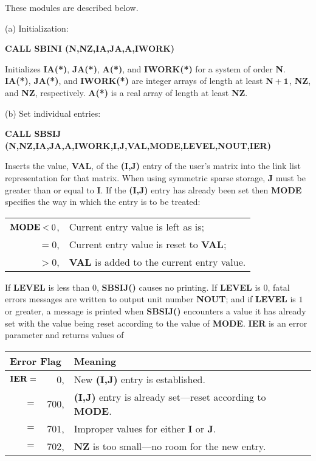 \noindent
These modules are described below.
 
\bigskip 
 (a) Initialization:
 
\bigskip
\centerline{\bf CALL SBINI (N,NZ,IA,JA,A,IWORK)}
\bigskip
 
\noindent
Initializes {\bf IA(*)}, {\bf JA(*)}, {\bf A(*)}, and {\bf IWORK(*)} for 
a system of order {\bf N}.  {\bf IA(*)}, {\bf JA(*)}, and {\bf IWORK(*)} 
are integer arrays of length at least ${\bf N+1}$, {\bf NZ}, and {\bf NZ}, 
respectively.  {\bf A(*)} is a real array of length at least {\bf NZ}.
 
\bigskip 
 (b) Set individual entries:
 
\bigskip
\centerline{\bf CALL SBSIJ (N,NZ,IA,JA,A,IWORK,I,J,VAL,MODE,LEVEL,NOUT,IER)}
\bigskip
 
\noindent 
Inserts the value, {\bf VAL}, of the {\bf (I,J)} entry of the user's 
matrix into the link list representation for that matrix.  When using 
symmetric sparse storage, {\bf J} must be greater than or equal to 
{\bf I}. If the {\bf (I,J)} entry has already been set then {\bf MODE} 
specifies the way in which the entry is to be treated: 
 
\bigskip
\begin{tabular}{rl} 
  ${\bf MODE}<0$, & Current entry value is left as is; \\
            $=0$, & Current entry value is reset to {\bf VAL}; \\
            $>0$, & {\bf VAL} is added to the current entry value.
\end{tabular} 
\bigskip
 
\noindent
If {\bf LEVEL} is less than $0$, {\bf SBSIJ()} causes no printing.  If
{\bf LEVEL} is $0$, fatal errors messages are written to output unit 
number {\bf NOUT}; and if {\bf LEVEL} is $1$ or greater, a message is 
printed when {\bf SBSIJ()} encounters a value it has already set with the 
value being reset according to the value of {\bf MODE}.  {\bf IER} is 
an error parameter and returns values of
 
\bigskip
\begin{tabular}{rrl} \hline
  \multicolumn{2}{l}{Error Flag} & Meaning \\ \hline
   ${\bf IER} =$ & $0$, & New {\bf (I,J)} entry is established. \\
   $ =$ & $700$, & {\bf (I,J)} entry is already set---reset according
                         to {\bf MODE}. \\
   $ =$ & $701$, & Improper values for either {\bf I} or {\bf J}. \\
   $ =$ & $702$, & {\bf NZ} is too small---no room for the new entry. \\ \hline
\end{tabular} 
\bigskip
 
